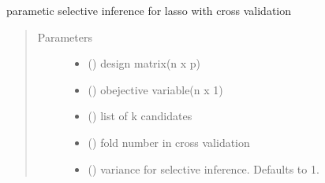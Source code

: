 \documentclass[letterpaper,10pt,english]{sphinxmanual}
\begin{document}
\label{\detokenize{selective:module-selective_inference.lasso_si}}

\begin{fulllineitems}
\label{\detokenize{selective:selective_inference.lasso_si.parametric_lasso_cv_si}}
parametic selective inference for lasso with cross validation
\begin{quote}\begin{description}
\item[{Parameters}] \leavevmode\begin{itemize}
\item {} 
 () \textendash{} design matrix(n x p)

\item {} 
 () \textendash{} obejective variable(n x 1)

\item {} 
 (\sphinxstyleliteralemphasis{\sphinxupquote{{[}}}\sphinxstyleliteralemphasis{\sphinxupquote{{]}}}) \textendash{} list of k candidates

\item {} 
 () \textendash{} fold number in cross validation

\item {} 
 (\sphinxstyleliteralemphasis{\sphinxupquote{, }}) \textendash{} variance for selective inference. Defaults to 1.


\end{itemize}
\end{description}
\end{quote}
\end{fulllineitems}
\end{document}
